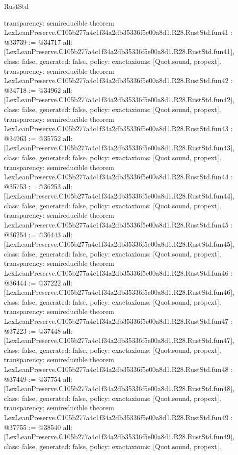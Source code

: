 \begin{lexlean}{RustStd}
\begin{coremodule}
{  transparency: semireducible
}
theorem LexLeanPreserve.C105b277a4c1f34a2db35336f5e00a8d1.R28.RustStd.fun41 : @33739 := @34717 {
  all: [LexLeanPreserve.C105b277a4c1f34a2db35336f5e00a8d1.R28.RustStd.fun41],
  class: false,
  generated: false,
  policy: exact{axioms: [Quot.sound, propext]},
  transparency: semireducible
}
theorem LexLeanPreserve.C105b277a4c1f34a2db35336f5e00a8d1.R28.RustStd.fun42 : @34718 := @34962 {
  all: [LexLeanPreserve.C105b277a4c1f34a2db35336f5e00a8d1.R28.RustStd.fun42],
  class: false,
  generated: false,
  policy: exact{axioms: [Quot.sound, propext]},
  transparency: semireducible
}
theorem LexLeanPreserve.C105b277a4c1f34a2db35336f5e00a8d1.R28.RustStd.fun43 : @34963 := @35752 {
  all: [LexLeanPreserve.C105b277a4c1f34a2db35336f5e00a8d1.R28.RustStd.fun43],
  class: false,
  generated: false,
  policy: exact{axioms: [Quot.sound, propext]},
  transparency: semireducible
}
theorem LexLeanPreserve.C105b277a4c1f34a2db35336f5e00a8d1.R28.RustStd.fun44 : @35753 := @36253 {
  all: [LexLeanPreserve.C105b277a4c1f34a2db35336f5e00a8d1.R28.RustStd.fun44],
  class: false,
  generated: false,
  policy: exact{axioms: [Quot.sound, propext]},
  transparency: semireducible
}
theorem LexLeanPreserve.C105b277a4c1f34a2db35336f5e00a8d1.R28.RustStd.fun45 : @36254 := @36443 {
  all: [LexLeanPreserve.C105b277a4c1f34a2db35336f5e00a8d1.R28.RustStd.fun45],
  class: false,
  generated: false,
  policy: exact{axioms: [Quot.sound, propext]},
  transparency: semireducible
}
theorem LexLeanPreserve.C105b277a4c1f34a2db35336f5e00a8d1.R28.RustStd.fun46 : @36444 := @37222 {
  all: [LexLeanPreserve.C105b277a4c1f34a2db35336f5e00a8d1.R28.RustStd.fun46],
  class: false,
  generated: false,
  policy: exact{axioms: [Quot.sound, propext]},
  transparency: semireducible
}
theorem LexLeanPreserve.C105b277a4c1f34a2db35336f5e00a8d1.R28.RustStd.fun47 : @37223 := @37448 {
  all: [LexLeanPreserve.C105b277a4c1f34a2db35336f5e00a8d1.R28.RustStd.fun47],
  class: false,
  generated: false,
  policy: exact{axioms: [Quot.sound, propext]},
  transparency: semireducible
}
theorem LexLeanPreserve.C105b277a4c1f34a2db35336f5e00a8d1.R28.RustStd.fun48 : @37449 := @37754 {
  all: [LexLeanPreserve.C105b277a4c1f34a2db35336f5e00a8d1.R28.RustStd.fun48],
  class: false,
  generated: false,
  policy: exact{axioms: [Quot.sound, propext]},
  transparency: semireducible
}
theorem LexLeanPreserve.C105b277a4c1f34a2db35336f5e00a8d1.R28.RustStd.fun49 : @37755 := @38540 {
  all: [LexLeanPreserve.C105b277a4c1f34a2db35336f5e00a8d1.R28.RustStd.fun49],
  class: false,
  generated: false,
  policy: exact{axioms: [Quot.sound, propext]},
}
\end{coremodule}
\end{lexlean}
